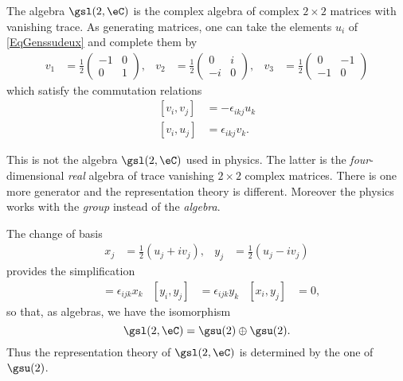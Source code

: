 The algebra $\gsl(2,\eC)$ is the complex algebra of complex $2\times 2$ matrices with vanishing trace. As generating matrices, one can take the elements $u_i$ of \eqref{EqGenssudeux} and complete them by
\begin{align*}
v_1&=\frac{ 1 }{2}
\begin{pmatrix}
  -1    &   0   \\
  0 &   1
\end{pmatrix},
&v_2&=\frac{ 1 }{2}
\begin{pmatrix}
  0 &   i   \\
  -i    &   0
\end{pmatrix},
&v_3&=\frac{ 1 }{2}
\begin{pmatrix}
  0 &   -1  \\
  -1    &   0
\end{pmatrix}
\end{align*}
which satisfy the commutation relations
\begin{subequations}
\begin{align}
    [v_i,v_j]&=-\epsilon_{ikj}u_k\\
    [v_i,u_j]&=\epsilon_{ikj}v_k.
\end{align}
\end{subequations}

\begin{remark}
    This is not the algebra \( \gsl(2,\eC)\) used in physics. The latter is the \emph{four}-dimensional \emph{real} algebra of trace vanishing \( 2\times 2\) complex matrices. There is one more generator and the representation theory is different. Moreover the physics works with the \emph{group} instead of the \emph{algebra}.
\end{remark}

The change of basis
\begin{align}
    x_j&=\frac{ 1 }{2}(u_j+iv_j),   &y_j&=\frac{ 1 }{2}(u_j-iv_j)
\end{align}
provides the simplification
\begin{align}
[x_i,x_j]&=\epsilon_{ijk}x_k    &[y_i,y_j]&=\epsilon_{ijk}y_k   &[x_i,y_j]&=0,
\end{align}
so that, as algebras, we have the isomorphism
\begin{equation}
    \gsl(2,\eC)=\gsu(2)\oplus\gsu(2).
\end{equation}
Thus the representation theory of $\gsl(2,\eC)$ is determined by the one of $\gsu(2)$.


